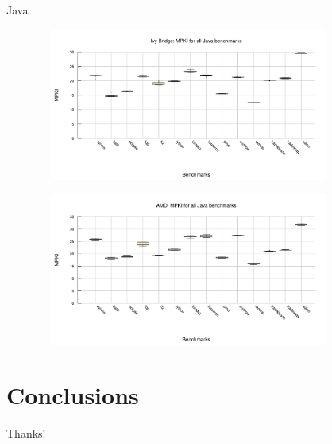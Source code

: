 \documentclass[10pt]{beamer}
\begin{document}
\begin{frame}{Java}
	\begin{minipage}{\textwidth}
		\begin{figure}
        \includegraphics[width=10cm, height=5cm]{figures/java_box_ivy_bridge.pdf}
		\end{figure}
	\end{minipage}
		\begin{minipage}{\textwidth}
			\begin{figure}
				\includegraphics[width=10cm, height=5cm]{figures/java_box_amd.pdf}
			\end{figure}
		\end{minipage}
\end{frame}
\section{Conclusions}

\begin{frame}[standout] 
    \huge \textlatin{Thanks!}
\end{frame}
\end{document}
